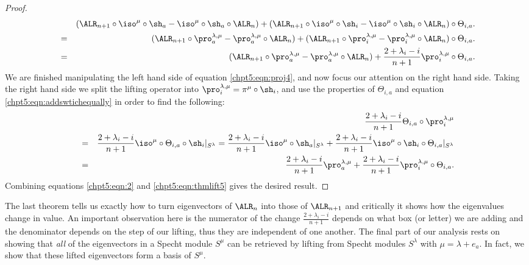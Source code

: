 \documentclass[11pt]{report}
\begin{document}
\begin{proof}
	\begin{eqnarray}
	& &	(\ALR_{n+1}  \circ \iso^{\mu} \circ \sh_{a}  - 
	\iso^{\mu} \circ \sh_{a} \circ \ALR_{n} )
	+(\ALR_{n+1}  \circ \iso^{\mu} \circ \sh_{i} - 
	\iso^{\mu} \circ \sh_{i} \circ \ALR_{n}) \circ 
	\Theta_{i,a}. \nonumber \\
	& = &  (\ALR_{n+1} \circ \pro_{a}^{\lambda,\mu}  - 
	\pro_{a}^{\lambda,\mu} \circ \ALR_{n} )
	+(\ALR_{n+1}  \circ \pro_{i}^{\lambda,\mu} - 
	\pro_{i}^{\lambda,\mu} \circ \ALR_{n}) \circ 
	\Theta_{i,a}. \nonumber \\
	& = &  (\ALR_{n+1} \circ \pro_{a}^{\lambda,\mu}  - 
	\pro_{a}^{\lambda,\mu} \circ \ALR_{n} )  +  \frac{2+\lambda_{i} 
		-i}{n+1}\pro_{i}^{\lambda,\mu} \circ \Theta_{i,a} .\label{chpt5:eqn:2} 
	\end{eqnarray}
	We are finished manipulating the left hand side of equation \eqref{chpt5:eqn:proj4}, and now focus our attention on the right hand side. Taking the right hand side we split the lifting operator into  $\pro_{i}^{\lambda,\mu} = \pi^{\mu} \circ \sh_{i}$,  and use the properties of $\Theta_{i,a}$ and equation \eqref{chpt5:eqn:addswtichequally} in order to find the following: 
	\begin{eqnarray}
	& & \frac{2 + \lambda_{i}-i}{n+1}\Theta_{i,a} \circ 
	\pro_{i}^{\lambda,\mu} \nonumber\\
	& = &
	\frac{2 +\lambda_{i}-i}{n+1}\iso^{\mu} \circ \Theta_{i,a} \circ \sh_{i} |_{S^{\lambda}}  
	=  \frac{2 +\lambda_{i}-i}{n+1} \iso^{\mu} \circ \sh_{a} |_{S^{\lambda}} + \frac{2 +\lambda_{i}-i}{n+1} \iso^{\mu} \circ \sh_{i} \circ \Theta_{i,a} |_{S^{\lambda}} \nonumber \\
	& = & \frac{2 +\lambda_{i}-i}{n+1} \pro_{a}^{\lambda,\mu} + \frac{2 +\lambda_{i}-i}{n+1} \pro_{i}^{\lambda,\mu} \circ \Theta_{i,a} \label{chpt5:eqn:thmlift5} .
	\end{eqnarray}
	Combining equations \eqref{chpt5:eqn:2} and \eqref{chpt5:eqn:thmlift5} gives the desired result.
\end{proof}


The last theorem tells us exactly how to turn eigenvectors of $\ALR_{n}$ 
into 
those of $\ALR_{n+1}$ and critically it shows how the eigenvalues 
change in value.
An important observation here is the numerator of the change $\frac{2+\lambda_{i} -i}{n+1}$ depends on what box (or letter) we are adding and the denominator depends on the step of our lifting, thus they are independent of one another. The final part of our analysis rests on showing that \emph{all} of the 
eigenvectors in a Specht module $S^{\mu}$ can be retrieved
by lifting from Specht modules $S^\lambda$ with $\mu = 
\lambda+e_a$. 
In fact, we show that these lifted eigenvectors form a basis of $S^\mu$.
\end{document}
